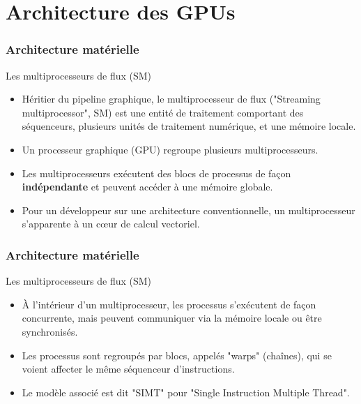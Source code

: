 \section{Architecture des GPUs}
\begin{frame}
    \frametitle{Architecture matérielle}
\begin{block}{Les multiprocesseurs de flux (SM)}
   \begin{itemize}
    \item<+-> Héritier du pipeline graphique, le multiprocesseur de flux ("Streaming multiprocessor", SM) 
    est une entité de traitement comportant des séquenceurs, plusieurs unités de traitement numérique, et une mémoire locale.
    \item<+-> Un processeur graphique (GPU) regroupe plusieurs multiprocesseurs. 
    \item<+-> Les multiprocesseurs exécutent des blocs de processus de façon \textbf{indépendante} et peuvent accéder à
    une mémoire globale.
    \item<+-> Pour un développeur sur une architecture conventionnelle, un multiprocesseur s'apparente à un c{\oe}ur de calcul
    vectoriel.
   \end{itemize} 
\end{block}
    

\end{frame}
\begin{frame}
    \frametitle{Architecture matérielle}
\begin{block}{Les multiprocesseurs de flux (SM)}
   \begin{itemize}
    \item<+->À l'intérieur d'un multiprocesseur, les processus s'exécutent de façon concurrente, mais peuvent communiquer
    via la mémoire locale ou être synchronisés.
    \item<+->Les processus sont regroupés par blocs, appelés "warps" (chaînes), qui se voient affecter le même séquenceur 
    d'instructions.
    \item<+->Le modèle associé est dit "SIMT" pour "Single Instruction Multiple Thread".
   \end{itemize} 
\end{block}
\end{frame}
